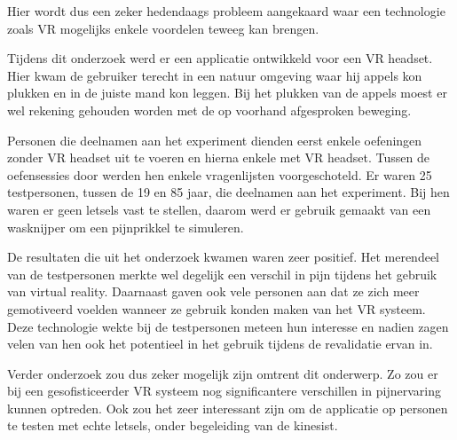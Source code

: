 Hier wordt dus een zeker hedendaags probleem aangekaard waar een technologie zoals VR mogelijks enkele voordelen teweeg kan brengen.

Tijdens dit onderzoek werd er een applicatie ontwikkeld voor een VR headset. Hier kwam de gebruiker terecht in een natuur omgeving waar hij appels kon plukken en in de juiste mand kon leggen. Bij het plukken van de appels moest er wel rekening gehouden worden met de op voorhand afgesproken beweging.

Personen die deelnamen aan het experiment dienden eerst enkele oefeningen zonder VR headset uit te voeren en hierna enkele met VR headset. Tussen de oefensessies door werden hen enkele vragenlijsten voorgeschoteld. Er waren 25 testpersonen, tussen de 19 en 85 jaar, die deelnamen aan het experiment. Bij hen waren er geen letsels vast te stellen, daarom werd er gebruik gemaakt van een wasknijper om een pijnprikkel te simuleren.

De resultaten die uit het onderzoek kwamen waren zeer positief. Het merendeel van de testpersonen merkte wel degelijk een verschil in pijn tijdens het gebruik van virtual reality. Daarnaast gaven ook vele personen aan dat ze zich meer gemotiveerd voelden wanneer ze gebruik konden maken van het VR systeem. Deze technologie wekte bij de testpersonen meteen hun interesse en nadien zagen velen van hen ook het potentieel in het gebruik tijdens de revalidatie ervan in.

Verder onderzoek zou dus zeker mogelijk zijn omtrent dit onderwerp. Zo zou er bij een gesofisticeerder VR systeem nog significantere verschillen in pijnervaring kunnen optreden. Ook zou het zeer interessant zijn om de applicatie op personen te testen met echte letsels, onder begeleiding van de kinesist.
